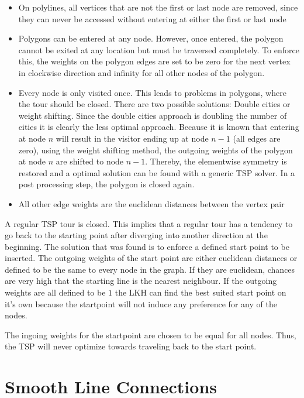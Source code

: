 \begin{itemize}
\item On polylines, all vertices that are not the first or last node are removed, since they can never be accessed without entering at either the first or last node 
\item Polygons can be entered at any node. However, once entered, the polygon cannot be exited at any location but must be traversed completely. To enforce this, the weights on the polygon edges are set to be zero for the next vertex in clockwise direction and infinity for all other nodes of the polygon.
\item Every node is only visited once. This leads to problems in polygons, where the tour should be closed. There are two possible solutions: Double cities or weight shifting. Since the double cities approach is doubling the number of cities it is clearly the less optimal approach. Because it is known that entering at node $n$ will result in the visitor ending up at node $n-1$ (all edges are zero), using the weight shifting method, the outgoing weights of the polygon at node $n$ are shifted to node $n-1$. Thereby, the elementwise symmetry is restored and a optimal solution can be found with a generic TSP solver. In a post processing step, the polygon is closed again.
\item All other edge weights are the euclidean distances between the vertex pair
\end{itemize}

A regular TSP tour is closed. This implies that a regular tour has a tendency to go back to the starting point after diverging into another direction at the beginning. The solution that was found is to enforce a defined start point to be inserted. The outgoing weights of the start point are either euclidean distances or defined to be the same to every node in the graph. If they are euclidean, chances are very high that the starting line is the nearest neighbour. If the outgoing weights are all defined to be $1$ the LKH can find the best suited start point on it's own because the startpoint will not induce any preference for any of the nodes.

The ingoing weights for the startpoint are chosen to be equal for all nodes. Thus, the TSP will never optimize towards traveling back to the start point.

\section{Smooth Line Connections}

